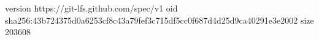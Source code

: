 version https://git-lfs.github.com/spec/v1
oid sha256:43b724375d0a6253cf8c43a79fef3c715df5cc0f687d4d25d9ca40291e3e2002
size 203608
